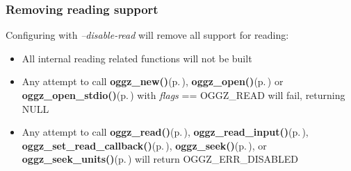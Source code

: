 \subsubsection{Removing reading support}\label{no_decode}
Configuring with {\em --disable-read\/} will remove all support for reading:\begin{itemize}
\item All internal reading related functions will not be built\item Any attempt to call {\bf oggz\_\-new()}{\rm (p.\,\pageref{oggz_8h_a4})}, {\bf oggz\_\-open()}{\rm (p.\,\pageref{oggz_8h_a5})} or {\bf oggz\_\-open\_\-stdio()}{\rm (p.\,\pageref{oggz_8h_a6})} with {\em flags\/} == OGGZ\_\-READ will fail, returning NULL\item Any attempt to call {\bf oggz\_\-read()}{\rm (p.\,\pageref{group__read__api_ga2})}, {\bf oggz\_\-read\_\-input()}{\rm (p.\,\pageref{group__read__api_ga3})}, {\bf oggz\_\-set\_\-read\_\-callback()}{\rm (p.\,\pageref{group__read__api_ga1})}, {\bf oggz\_\-seek()}{\rm (p.\,\pageref{group__seek__api_ga8})}, or {\bf oggz\_\-seek\_\-units()}{\rm (p.\,\pageref{group__seek__api_ga4})} will return OGGZ\_\-ERR\_\-DISABLED \end{itemize}


